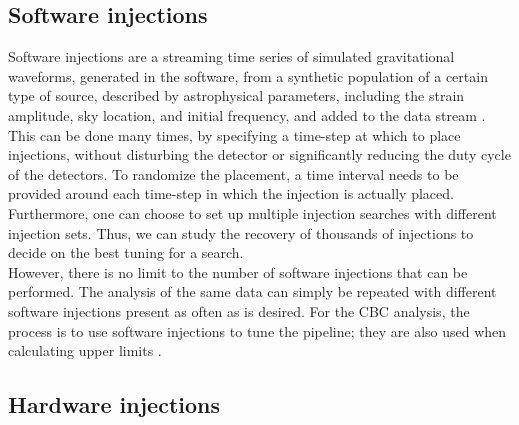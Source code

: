 \documentclass[binding=0.6cm, LaM]{sapthesis}
\begin{document}
\subsection{Software injections}

	Software injections are a streaming time series of simulated gravitational waveforms, 
	generated in the software, from a synthetic population of a certain type of source, 
	described by astrophysical parameters, including the strain amplitude, sky location, 	
	and initial frequency, and added to the data stream \cite{30}. 
	This can be done many times, by specifying a time-step at which to place injections, 
	without disturbing the detector or significantly reducing the duty cycle of the detectors. 
	To randomize the placement, a time interval needs to be provided around 
	each time-step in which the injection is actually placed. 
	Furthermore, one can choose to set up multiple injection searches with different injection sets. 
	Thus, we can study the recovery of thousands of injections to decide on the best tuning for a search. \\ 
	However, there is no limit to the number of software injections that can be performed. 
	The analysis of the same data can simply be repeated with different software injections present as often as is desired. 
	For the CBC analysis, the process is to use software injections to tune the pipeline; 
	they are also used when calculating upper limits \cite{47}.
	
\subsection{Hardware injections}
\end{document}
